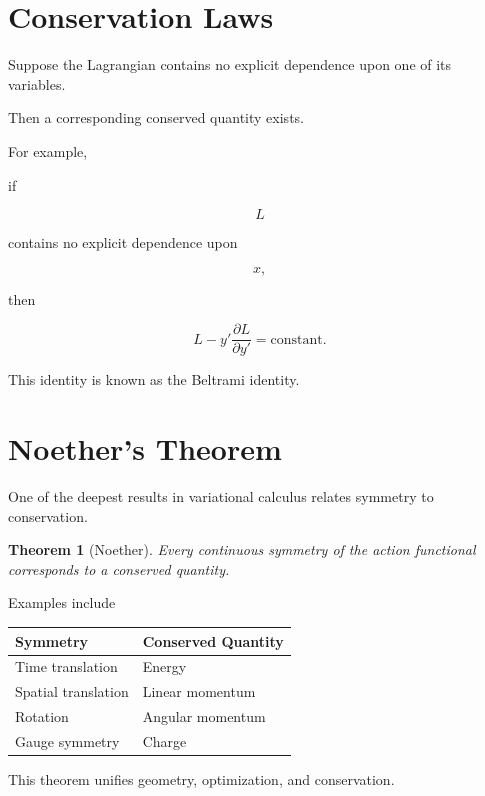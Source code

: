 \documentclass[11pt,fleqn]{book}
\numberwithin{equation}{chapter}
\theoremstyle{plain}
\newtheorem{theorem}{Theorem}[chapter]
\theoremstyle{definition}
\theoremstyle{remark}
\begin{document}

\section{Conservation Laws}

Suppose the Lagrangian contains no explicit dependence upon one of its
variables.

Then a corresponding conserved quantity exists.

For example,

if

\[
L
\]

contains no explicit dependence upon

\[
x,
\]

then

\[
\boxed{
L
-
y'
\frac{\partial L}{\partial y'}
=
\text{constant}.
}
\]

This identity is known as the Beltrami identity.


\section{Noether's Theorem}

One of the deepest results in variational calculus relates symmetry to
conservation.

\begin{theorem}[Noether]

Every continuous symmetry of the action functional corresponds to a
conserved quantity.

\end{theorem}

Examples include

\begin{center}
\begin{tabular}{ll}
\toprule
Symmetry & Conserved Quantity\\
\midrule
Time translation & Energy\\
Spatial translation & Linear momentum\\
Rotation & Angular momentum\\
Gauge symmetry & Charge\\
\bottomrule
\end{tabular}
\end{center}

This theorem unifies geometry, optimization, and conservation.
\end{document}
